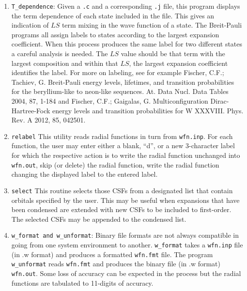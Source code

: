 \documentclass[fleqn,10pt]{book}
\begin{document}
\begin{enumerate}
\item {\tt T\_dependence}:  Given a {\tt .c} and a corresponding {\tt .j}
 file, this program displays the term dependence of each state included in the
 file. This gives an 
indication of $LS$ term mixing in the wave function of a state.  
The Breit-Pauli 
programs all assign labels to states according to the largest expansion 
coefficient. When this process produces the same label for two different states 
a careful analysis is needed. The $LS$ value should be that term 
with the largest 
composition and within that $LS$, the largest expansion coefficient identifies 
the label.  For more on labeling, see for example
Fischer, C.F.; Tachiev, G. Breit-Pauli energy levels, lifetimes, and transition probabilities for the beryllium-like to neon-like sequences. At. Data Nucl. Data Tables 2004, 87, 1-184 and 
Fischer, C.F.; Gaigalas, 
G. Multiconfiguration Dirac-Hartree-Fock energy levels and transition probabilities for W XXXVIII. Phys. Rev. A 2012, 85, 042501.
\item {\tt relabel} This utility reads radial functions in turn from {\tt wfn.inp}. 
 For each function, the user may enter either a blank, ``d'', or a 
new 3-character label for which the respective action is to write the radial 
function unchanged
into {\tt wfn.out}, skip (or delete) the radial function, write the radial function 
changing the displayed label to the entered label.

\item {\tt select}  This routine selects those CSFs from a designated list that
contain orbitals specified by the user.  This may be useful when expansions that
have been condensed are extended with new CSFs to be included to first-order.
The selected CSFs may be appended to the condensed list. 

\item {\tt w\_format and w\_unformat}: Binary file formats are not always compatible 
in going from one system environment to another. {\tt w\_format} 
takes a {\tt wfn.inp} file (in .w format) and produces a formatted
{\tt wfn.fmt} file.  The program {\tt w\_unformat} reads {\tt wfn.fmt}
and produces the binary file (in .w format) {\tt wfn.out}.  Some loss of accuracy can be 
expected in the process but the radial functions are tabulated to 11-digits of accuracy.
\end{enumerate} 
\end{document}
